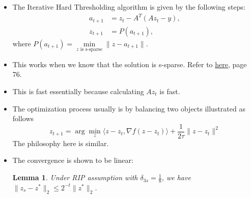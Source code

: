 \documentclass[11pt,reqno]{amsart}
\newtheorem{lemma}[theorem]{Lemma}
\theoremstyle{remark}
\begin{document}
\begin{sloppypar}
\begin{itemize}
\begin{enumerate}
\begin{proof}
\begin{align*}
\end{align*}
We use the lemma to arrive $\leq\dfrac{\delta_{2s}}{1-\delta_{2s}}\lVert\alpha_{S_0}\rVert\sum\limits_{2k\geq 1}\lVert \alpha_{S_k}\rVert_2$.
Further, the construction of $\alpha$ yields $\leq \dfrac{\delta_{2S}}{1-\delta_{2S}}\lVert\alpha_{S_0}\rVert_2\sum\limits_{k\geq 1}\dfrac{\lVert\alpha_{S_{k-1}}\rVert}{\sqrt{s}}$.
\end{proof}
\end{enumerate}
\item The Iterative Hard Thresholding algorithm is given by the following steps:
\begin{align}
    a_{t+1} &= z_t - A^T(Az_t - y), \\
    z_{t+1} &= P(a_{t+1}),
\end{align}
where $P(a_{t+1})=\min\limits_{z\text{ is s-sparse}}\lVert z-a_{t+1}\rVert$.
\item This works when we know that the solution is s-sparse. Refer to \href{https://users.math.msu.edu/users/iwenmark/Teaching/MTH994/Holger_Simon_book.pdf}{here}, page 76.
\item This is fast essentially because calculating $Az_t$ is fast.
\item The optimization process usually is by balancing two objects illustrated as follows
\[
z_{t+1}=\arg\min_z\langle z-z_t,\nabla f(z-z_t)\rangle+\frac 1{2\tau}\lVert z-z_t\rVert^2
\] 
The philosophy here is similar.
\item The convergence is shown to be linear:
\begin{lemma}
Under RIP assumption with $\delta_{3s}=\frac 18$, we have $\lVert z_s-z^*\rVert_2\leq 2^{-t}\lVert z^*\rVert_2$.
\end{lemma}
\end{itemize}


\end{sloppypar}
\end{document}
